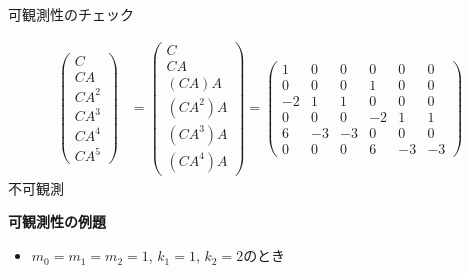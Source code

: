\documentclass[a4paper,11pt]{jreport}
\begin{document}
可観測性のチェック

\begin{align}
 \left(\begin{array}{l}
        C \\
        CA \\
        CA^2  \\
	CA^3 \\
	CA^4 \\
	CA^5
       \end{array}\right)
 &=
 \left(\begin{array}{l}
        C \\
        CA \\
        (CA)A  \\
	(CA^2)A \\
	(CA^3)A \\
	(CA^4)A
       \end{array}\right)
 =
 \left(\begin{array}{rrrrrr}
        1 & 0 & 0 & 0 & 0 & 0      \\
        0 & 0 & 0 & 1 & 0 & 0      \\
        -2& 1 & 1 & 0 & 0 & 0      \\
	0 & 0 & 0 & -2& 1 & 1 \\
	6 & -3& -3& 0 & 0 & 0 \\
	0 & 0 & 0 & 6 & -3& -3 
       \end{array}\right)
\nonumber
\end{align}
不可観測




\newpage
\noindent
{\bf 可観測性の例題}

\begin{itemize}
\item $m_0=m_1=m_2=1$, $k_1=1$, $k_2=2$のとき
\end{itemize}
\end{document}
